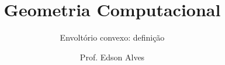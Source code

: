 \title{Geometria Computacional}
\subtitle{Envoltório convexo: definição}
\date{}
\author{Prof. Edson Alves}
